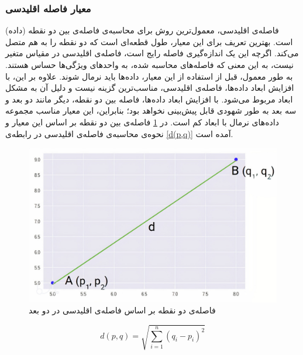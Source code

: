 \subsubsection{معیار فاصله اقلیدسی}
فاصله‌ی اقلیدسی، معمول‌ترین روش برای محاسبه‌ی فاصله‌ی بین دو نقطه (داده) است. بهترین تعریف برای این معیار، طول قطعه‌ای است که دو نقطه را به هم متصل می‌کند. اگرچه این یک اندازه‌گیری فاصله رایج است، فاصله‌ی اقلیدسی در مقیاس متغیر نیست، به این معنی که فاصله‌های محاسبه شده، به واحدهای ویژگی‌ها حساس هستند. به طور معمول، قبل از استفاده از این معیار، داده‌ها باید نرمال شوند. علاوه بر این، با افزایش ابعاد داده‌ها، فاصله‌ی اقلیدسی، مناسب‌ترین گزینه نیست و دلیل آن به مشکل ابعاد  مربوط می‌شود. با افزایش ابعاد داده‌ها، فاصله بین دو نقطه، دیگر مانند دو بعد و سه بعد به طور شهودی قابل پیش‌بینی نخواهد بود؛ بنابراین، این معیار مناسب مجموعه‌ داده‌های نرمال با ابعاد کم است. در \cref{fig:euclidean_distance} فاصله‌ی بین دو نقطه بر اساس این معیار و نحوه‌ی محاسبه‌ی فاصله‌ی اقلیدسی در رابطه‌ی \ref{d(p,q)} آمده است.

\begin{figure}[h!]
	\centering\includegraphics[width=0.75\linewidth]{figures/euclidean_distance}
	\caption{فاصله‌ی دو نقطه بر اساس فاصله‌ی اقلیدسی در دو بعد}\label{fig:euclidean_distance}
\end{figure}

\begin{equation} \label{d(p,q)}
	d\left( p,q\right) = \sqrt {\sum_{i=1}^{n} \left( q_{i}-p_{i}\right)^2 } 
\end{equation} 


